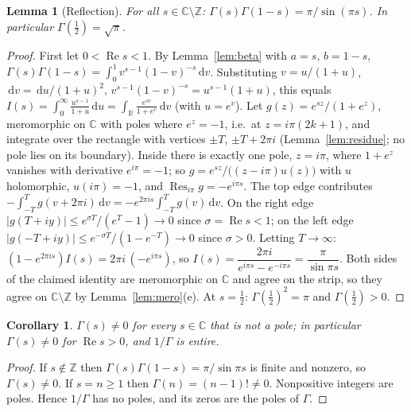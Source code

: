 \documentclass[11pt]{article}
\newtheorem{lemma}[theorem]{Lemma}
\newtheorem{corollary}[theorem]{Corollary}
\theoremstyle{definition}
\newcommand{\C}{\mathbb{C}}
\newcommand{\R}{\mathbb{R}}
\newcommand{\Z}{\mathbb{Z}}
\newcommand{\re}{\operatorname{Re}}
\newcommand{\res}{\operatorname{Res}}
\newcommand{\dd}{\,\mathrm{d}}
\begin{document}
\begin{lemma}[Reflection]\label{lem:reflection}
For all $s\in\C\setminus\Z$: $\Gamma(s)\Gamma(1-s)=\pi/\sin(\pi s)$. In particular $\Gamma(\tfrac12)=\sqrt\pi$.
\end{lemma}
\begin{proof}
First let $0<\re s<1$. By Lemma~\ref{lem:beta} with $a=s$, $b=1-s$,
$\Gamma(s)\Gamma(1-s)=\int_0^1 v^{s-1}(1-v)^{-s}\dd v$.
Substituting $v=u/(1+u)$, $\dd v=\dd u/(1+u)^2$, $v^{s-1}(1-v)^{-s}=u^{s-1}(1+u)$, this equals
$I(s)=\int_0^\infty \frac{u^{s-1}}{1+u}\dd u=\int_{\R}\frac{e^{sv}}{1+e^{v}}\dd v$ (with $u=e^{v}$).
Let $g(z)=e^{sz}/(1+e^{z})$, meromorphic on $\C$ with poles where $e^{z}=-1$, i.e.\ at $z=i\pi(2k+1)$, and integrate over the rectangle with vertices $\pm T$, $\pm T+2\pi i$ (Lemma~\ref{lem:residue}; no pole lies on its boundary).
Inside there is exactly one pole, $z=i\pi$, where $1+e^{z}$ vanishes with derivative $e^{i\pi}=-1$; so $g=e^{sz}/\bigl((z-i\pi)u(z)\bigr)$ with $u$ holomorphic, $u(i\pi)=-1$, and $\res_{i\pi}g=-e^{i\pi s}$.
The top edge contributes $-\int_{-T}^{T}g(v+2\pi i)\dd v=-e^{2\pi i s}\int_{-T}^{T}g(v)\dd v$.
On the right edge $|g(T+iy)|\le e^{\sigma T}/(e^{T}-1)\to0$ since $\sigma=\re s<1$; on the left edge $|g(-T+iy)|\le e^{-\sigma T}/(1-e^{-T})\to0$ since $\sigma>0$.
Letting $T\to\infty$: $(1-e^{2\pi i s})I(s)=2\pi i\,(-e^{i\pi s})$, so
$I(s)=\dfrac{2\pi i}{e^{i\pi s}-e^{-i\pi s}}=\dfrac{\pi}{\sin\pi s}$.
Both sides of the claimed identity are meromorphic on $\C$ and agree on the strip, so they agree on $\C\setminus\Z$ by Lemma~\ref{lem:mero}(e).
At $s=\tfrac12$: $\Gamma(\tfrac12)^{2}=\pi$ and $\Gamma(\tfrac12)>0$.
\end{proof}

\begin{corollary}\label{cor:gamma-nonzero}
$\Gamma(s)\ne0$ for every $s\in\C$ that is not a pole; in particular $\Gamma(s)\ne 0$ for $\re s>0$, and $1/\Gamma$ is entire.
\end{corollary}
\begin{proof}
If $s\notin\Z$ then $\Gamma(s)\Gamma(1-s)=\pi/\sin\pi s$ is finite and nonzero, so $\Gamma(s)\ne0$.
If $s=n\ge1$ then $\Gamma(n)=(n-1)!\ne0$.
Nonpositive integers are poles.
Hence $1/\Gamma$ has no poles, and its zeros are the poles of $\Gamma$.
\end{proof}
\end{document}
